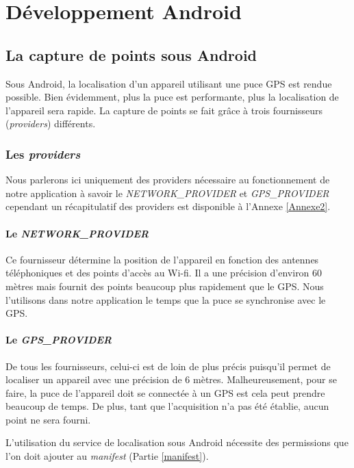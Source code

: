 \chapter{Développement Android}

\section{La capture de points sous Android}
\label{capture de points}
Sous Android, la localisation d'un appareil utilisant une puce GPS est rendue possible. Bien évidemment, plus la puce est performante, plus la localisation de l’appareil sera rapide. La capture de points se fait grâce à trois fournisseurs (\textit{providers}) différents.

\subsection{Les \textit{providers}}
Nous parlerons ici uniquement des providers nécessaire au fonctionnement de notre application à savoir le \textit{NETWORK\_PROVIDER} et \textit{GPS\_PROVIDER} cependant un récapitulatif des providers est disponible à l'Annexe \ref{Annexe2}.

\subsubsection{Le \textit{NETWORK\_PROVIDER}}
Ce fournisseur détermine la position de l'appareil en fonction des antennes téléphoniques et des points d'accès au Wi-fi. Il a une précision d'environ 60 mètres mais fournit des points beaucoup plus rapidement que le GPS. Nous l'utilisons dans notre application le temps que la puce se synchronise avec le GPS.

\subsubsection{Le \textit{GPS\_PROVIDER}}
De tous les fournisseurs, celui-ci est de loin de plus précis puisqu'il permet de localiser un appareil avec une précision de 6 mètres. Malheureusement, pour se faire, la puce de l'appareil doit se connectée à un GPS est cela peut prendre beaucoup de temps. De plus, tant que l'acquisition n'a pas été établie, aucun point ne sera fourni.

\begin{note}
L'utilisation du service de localisation sous Android nécessite des permissions que l'on doit ajouter au \textit{manifest} (Partie \ref{manifest}).
\end{note}


